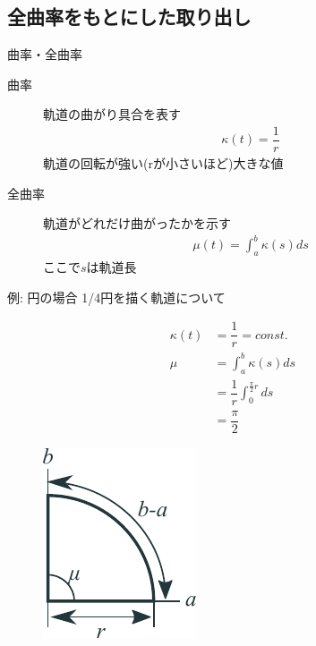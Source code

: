\documentclass[12pt, xetex, xcolor=pdftex, dvipsnames]{beamer}
\begin{document}
\subsection{全曲率をもとにした取り出し}
\begin{frame}{曲率・全曲率}
  \begin{description}
    \item[曲率] 軌道の曲がり具合を表す
    \begin{align}
      \kappa(t) = \dfrac{1}{r}
    \end{align}
      軌道の回転が強い(rが小さいほど)大きな値
    \item[全曲率] 軌道がどれだけ曲がったかを示す
    \begin{align}
      \mu(t) = \int_a^b \kappa(s)ds
    \end{align}
    ここで$s$は軌道長
  \end{description}
\end{frame}
\begin{frame}{例: 円の場合}
  1/4円を描く軌道について
  \begin{minipage}{0.5\hsize}
    \begin{align}
      \kappa(t) &= \dfrac{1}{r} = const.\\
      \mu &= \int_a^b\kappa(s)ds \\
      &= \dfrac{1}{r}\int_0^{\frac{\pi}{2}r}ds\\
      &= \dfrac{\pi}{2}
    \end{align}
  \end{minipage}%
  \begin{minipage}{0.5\hsize}
    \begin{figure}
      \centering
      \includegraphics{img/curvature.pdf}
    \end{figure}
  \end{minipage}
\end{frame}
\end{document}
